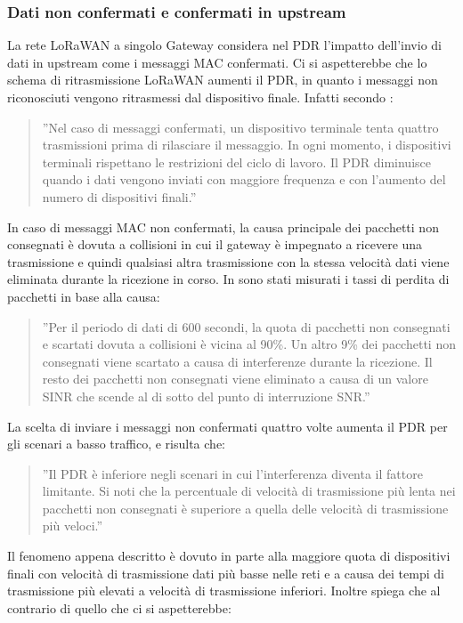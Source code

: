\documentclass[a4paper]{report} %
\begin{document}
\subsubsection{Dati non confermati e confermati in upstream}
La rete LoRaWAN a singolo Gateway considera nel PDR l'impatto dell'invio di dati in upstream come i messaggi MAC confermati. Ci si aspetterebbe che lo schema di ritrasmissione LoRaWAN aumenti il PDR, in quanto i messaggi non riconosciuti vengono ritrasmessi dal dispositivo finale. Infatti secondo \cite{art:rif.49}:
\begin{quote}
	''Nel caso di messaggi confermati, un dispositivo terminale tenta quattro trasmissioni prima di rilasciare il messaggio. In ogni momento, i dispositivi terminali rispettano le restrizioni del ciclo di lavoro. Il PDR diminuisce quando i dati vengono inviati con maggiore frequenza e con l'aumento del numero di dispositivi finali.''
\end{quote}
In caso di messaggi MAC non confermati, la causa principale dei pacchetti non consegnati è dovuta a collisioni in cui il gateway è impegnato a ricevere una trasmissione e quindi qualsiasi altra trasmissione con la stessa velocità dati viene eliminata durante la ricezione in corso. In \cite{art:rif.49} sono stati misurati i tassi di perdita di pacchetti in base alla causa:
\begin{quote}
	''Per il periodo di dati di 600 secondi, la quota di pacchetti non consegnati e scartati dovuta a collisioni è vicina al 90\%. Un altro 9\% dei pacchetti non consegnati viene scartato a causa di interferenze durante la ricezione. Il resto dei pacchetti non consegnati viene eliminato a causa di un valore SINR che scende al di sotto del punto di interruzione SNR.'' 
\end{quote}	
La scelta di inviare i messaggi non confermati quattro volte aumenta il PDR per gli scenari a basso traffico, e risulta che:
\begin{quote}
	''Il PDR è inferiore negli scenari in cui l'interferenza diventa il fattore limitante. Si noti che la percentuale di velocità di trasmissione più lenta nei pacchetti non consegnati è superiore a quella delle velocità di trasmissione più veloci.'' 
\end{quote}	
Il fenomeno appena descritto è dovuto in parte alla maggiore quota di dispositivi finali con velocità di trasmissione dati più basse nelle reti e a causa dei tempi di trasmissione più elevati a velocità di trasmissione inferiori. 
Inoltre \cite{art:rif.49} spiega che al contrario di quello che ci si aspetterebbe:
\end{document}
